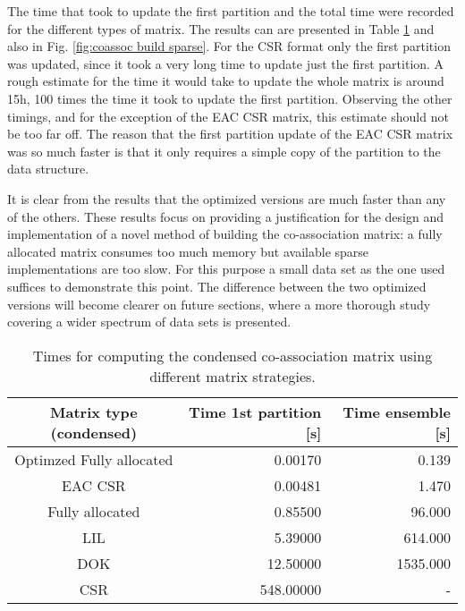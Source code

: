 The time that took to update the first partition and the total time were recorded for the different types of matrix.
The results can are presented in Table \ref{tab:coassoc build sparse} and also in Fig. \ref{fig:coassoc build sparse}.
For the CSR format only the first partition was updated, since it took a very long time to update just the first partition.
A rough estimate for the time it would take to update the whole matrix is around 15h, 100 times the time it took to update the first partition.
Observing the other timings, and for the exception of the EAC CSR matrix, this estimate should not be too far off.
The reason that the first partition update of the EAC CSR matrix was so much faster is that it only requires a simple copy of the partition to the data structure.

It is clear from the results that the optimized versions are much faster than any of the others.
These results focus on providing a justification for the design and implementation of a novel method of building the co-association matrix: a fully allocated matrix consumes too much memory but available sparse implementations are too slow.
For this purpose a small data set as the one used suffices to demonstrate this point.
The difference between the two optimized versions will become clearer on future sections, where a more thorough study covering a wider spectrum of data sets is presented. 


\begin{table}[h]
\centering
 \caption{Times for computing the condensed co-association matrix using different matrix strategies.}
\begin{tabular}{crr}
\toprule
  Matrix type (condensed) &  Time 1st partition [s] &  Time ensemble [s] \\
\midrule
 Optimzed Fully allocated &                 0.00170 &              0.139 \\
                  EAC CSR &                 0.00481 &              1.470 \\
          Fully allocated &                 0.85500 &             96.000 \\
                      LIL &                 5.39000 &            614.000 \\
                      DOK &                12.50000 &           1535.000 \\
                      CSR &               548.00000 &                - \\
\bottomrule
\end{tabular}
\label{tab:coassoc build sparse}
\end{table}



